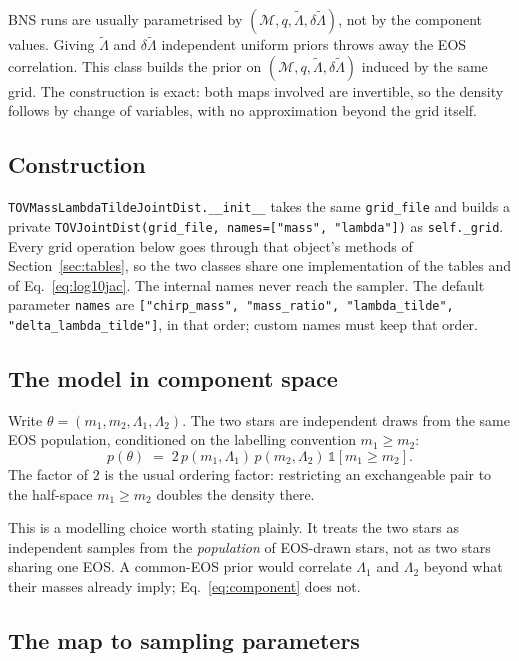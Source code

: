 \documentclass[11pt,a4paper]{article}
\newcommand{\Mc}{\mathcal{M}}
\newcommand{\lt}{\tilde{\Lambda}}
\newcommand{\dlt}{\delta\tilde{\Lambda}}
\newcommand{\code}[1]{\texttt{#1}}
\begin{document}
BNS runs are usually parametrised by $(\Mc, q, \lt, \dlt)$, not by the
component values. Giving $\lt$ and $\dlt$ independent uniform priors throws
away the EOS correlation. This class builds the prior on
$(\Mc, q, \lt, \dlt)$ induced by the same grid. The construction is exact: both
maps involved are invertible, so the density follows by change of variables,
with no approximation beyond the grid itself.

\subsection{Construction}

\code{TOVMassLambdaTildeJointDist.\_\_init\_\_} takes the same \code{grid\_file}
and builds a private \code{TOVJointDist(grid\_file, names=["mass", "lambda"])}
as \code{self.\_grid}. Every grid operation below goes through that object's
methods of Section~\ref{sec:tables}, so the two classes share one
implementation of the tables and of Eq.~\eqref{eq:log10jac}. The internal names
never reach the sampler. The default parameter \code{names} are
\code{["chirp\_mass", "mass\_ratio", "lambda\_tilde", "delta\_lambda\_tilde"]},
in that order; custom names must keep that order.

\subsection{The model in component space}

Write $\theta = (m_1, m_2, \Lambda_1, \Lambda_2)$. The two stars are
independent draws from the same EOS population, conditioned on the labelling
convention $m_1 \ge m_2$:
\begin{equation}
  p(\theta) \;=\; 2\, p(m_1, \Lambda_1)\, p(m_2, \Lambda_2)\,
  \mathbb{1}[m_1 \ge m_2].
  \label{eq:component}
\end{equation}
The factor of $2$ is the usual ordering factor: restricting an exchangeable pair
to the half-space $m_1 \ge m_2$ doubles the density there.

This is a modelling choice worth stating plainly. It treats the two stars as
independent samples from the \emph{population} of EOS-drawn stars, not as two
stars sharing one EOS. A common-EOS prior would correlate $\Lambda_1$ and
$\Lambda_2$ beyond what their masses already imply; Eq.~\eqref{eq:component}
does not.

\subsection{The map to sampling parameters}
\end{document}
